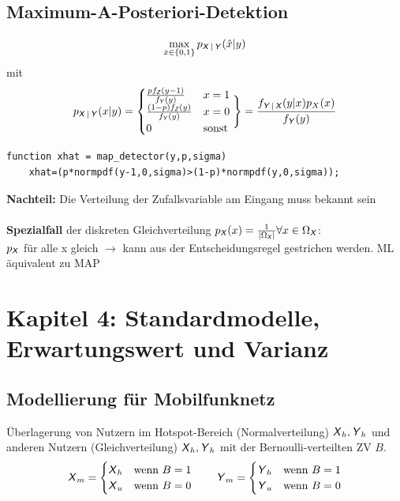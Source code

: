 \documentclass[deutsch]{latex4ei/latex4ei_sheet}
\begin{document}
\begin{sectionbox}
	\subsection{Maximum-A-Posteriori-Detektion}
	\[\max_{\hat x \in \{0,1\}} p_{\X|\Y}(\hat x|y)\] mit
	\[p_{\X|\Y}(x|y)=\begin{cases}
	 \frac{p f_{\Z}(y-1)}{f_{\Y}(y)} & x=1\\
	\frac{(1-p)f_{\Z}(y)}{f_{\Y}(y)} & x=0\\
	0 & \text{sonst}
	\end{cases} 
	\Bigg\} = \frac{f_{\Y|\X}(y|x)p_{X}(x)}{f_{\Y}(y)}\]
	\begin{lstlisting}[gobble=4]
	function xhat = map_detector(y,p,sigma)
	xhat=(p*normpdf(y-1,0,sigma)>(1-p)*normpdf(y,0,sigma));
	\end{lstlisting}
	\textbf{Nachteil:} Die Verteilung der Zufallsvariable am Eingang muss bekannt sein\\
	\\

	\textbf{Spezialfall} der diskreten Gleichverteilung $p_{\X}(x)=\frac{1}{\abs{\Omega_{\X}}} \forall x \in \Omega_{\X}$:\\
	$p_{\X}$ für alle x gleich $\to$ kann aus der Entscheidungsregel gestrichen
	werden. ML äquivalent zu MAP
\end{sectionbox}

\section{Kapitel 4: Standardmodelle, Erwartungswert und Varianz}
\begin{sectionbox}
	\subsection{Modellierung für Mobilfunknetz}
	Überlagerung von Nutzern im Hotspot-Bereich (Normalverteilung) $\X_h, \Y_h$ und anderen Nutzern (Gleichverteilung) $\X_h, \Y_h$ mit der Bernoulli-verteilten ZV $B$.
	\[\X_m=\begin{cases}
	\X_h & \text{wenn } B=1\\
	\X_u & \text{wenn } B=0\\
	\end{cases} \qquad 
	\Y_m=\begin{cases}
	\Y_h & \text{wenn } B=1\\
	\Y_u & \text{wenn } B=0\\
	\end{cases}
	\]
	
\end{sectionbox}
\end{document}
